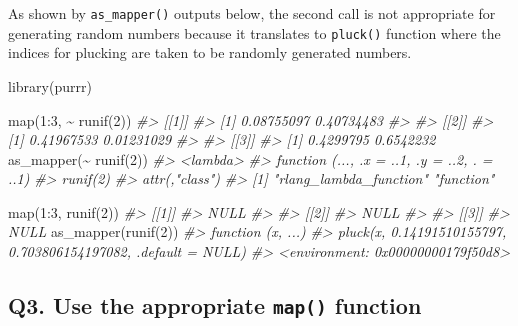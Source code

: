 \documentclass[
]{book}
\newenvironment{Shaded}{\begin{snugshade}}{\end{snugshade}}
\newcommand{\CommentTok}[1]{\textcolor[rgb]{0.56,0.35,0.01}{\textit{#1}}}
\newcommand{\DecValTok}[1]{\textcolor[rgb]{0.00,0.00,0.81}{#1}}
\newcommand{\FunctionTok}[1]{\textcolor[rgb]{0.00,0.00,0.00}{#1}}
\newcommand{\NormalTok}[1]{#1}
\newcommand{\SpecialCharTok}[1]{\textcolor[rgb]{0.00,0.00,0.00}{#1}}
\begin{document}
As shown by \texttt{as\_mapper()} outputs below, the second call is not appropriate for generating random numbers because it translates to \texttt{pluck()} function where the indices for plucking are taken to be randomly generated numbers.

\begin{Shaded}
\begin{Highlighting}[]
\FunctionTok{library}\NormalTok{(purrr)}

\FunctionTok{map}\NormalTok{(}\DecValTok{1}\SpecialCharTok{:}\DecValTok{3}\NormalTok{, }\SpecialCharTok{\textasciitilde{}} \FunctionTok{runif}\NormalTok{(}\DecValTok{2}\NormalTok{))}
\CommentTok{\#\textgreater{} [[1]]}
\CommentTok{\#\textgreater{} [1] 0.08755097 0.40734483}
\CommentTok{\#\textgreater{} }
\CommentTok{\#\textgreater{} [[2]]}
\CommentTok{\#\textgreater{} [1] 0.41967533 0.01231029}
\CommentTok{\#\textgreater{} }
\CommentTok{\#\textgreater{} [[3]]}
\CommentTok{\#\textgreater{} [1] 0.4299795 0.6542232}
\FunctionTok{as\_mapper}\NormalTok{(}\SpecialCharTok{\textasciitilde{}} \FunctionTok{runif}\NormalTok{(}\DecValTok{2}\NormalTok{))}
\CommentTok{\#\textgreater{} \textless{}lambda\textgreater{}}
\CommentTok{\#\textgreater{} function (..., .x = ..1, .y = ..2, . = ..1) }
\CommentTok{\#\textgreater{} runif(2)}
\CommentTok{\#\textgreater{} attr(,"class")}
\CommentTok{\#\textgreater{} [1] "rlang\_lambda\_function" "function"}

\FunctionTok{map}\NormalTok{(}\DecValTok{1}\SpecialCharTok{:}\DecValTok{3}\NormalTok{, }\FunctionTok{runif}\NormalTok{(}\DecValTok{2}\NormalTok{))}
\CommentTok{\#\textgreater{} [[1]]}
\CommentTok{\#\textgreater{} NULL}
\CommentTok{\#\textgreater{} }
\CommentTok{\#\textgreater{} [[2]]}
\CommentTok{\#\textgreater{} NULL}
\CommentTok{\#\textgreater{} }
\CommentTok{\#\textgreater{} [[3]]}
\CommentTok{\#\textgreater{} NULL}
\FunctionTok{as\_mapper}\NormalTok{(}\FunctionTok{runif}\NormalTok{(}\DecValTok{2}\NormalTok{))}
\CommentTok{\#\textgreater{} function (x, ...) }
\CommentTok{\#\textgreater{} pluck(x, 0.14191510155797, 0.703806154197082, .default = NULL)}
\CommentTok{\#\textgreater{} \textless{}environment: 0x00000000179f50d8\textgreater{}}
\end{Highlighting}
\end{Shaded}

\hypertarget{q3.-use-the-appropriate-map-function}{%
\subsection*{\texorpdfstring{Q3. Use the appropriate \texttt{map()} function}{Q3. Use the appropriate map() function}}\label{q3.-use-the-appropriate-map-function}}
\end{document}
